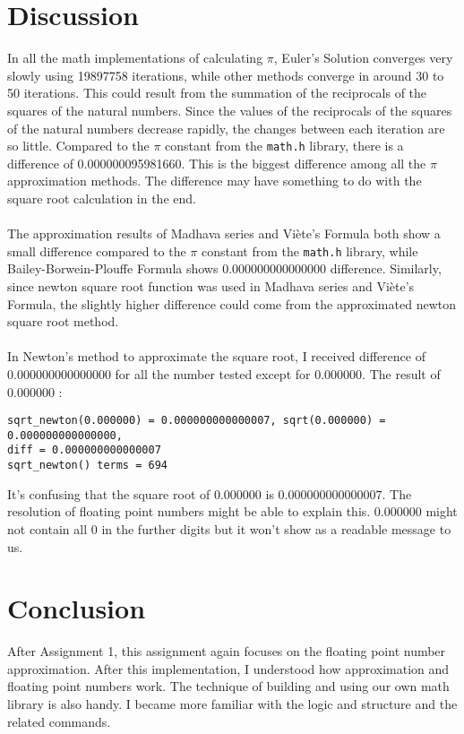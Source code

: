 \documentclass[12pt]{article}
\begin{document}
\section{Discussion}

In all the math implementations of calculating $\pi$, Euler’s Solution converges very slowly using 19897758 iterations, while other methods converge in around 30 to 50 iterations. This could result from the summation of the reciprocals of the squares of the natural numbers. Since the values of the reciprocals of the squares of the natural numbers decrease rapidly, the changes between each iteration are so little. Compared to the $\pi$ constant from the \texttt{math.h} library, there is a difference of 0.000000095981660. This is the biggest difference among all the $\pi$ approximation methods. The difference may have something to do with the square root calculation in the end.\\
\\
The approximation results of Madhava series and Viète’s Formula both show a small difference compared to the $\pi$ constant from the \texttt{math.h} library, while Bailey-Borwein-Plouffe Formula shows $0.000000000000000$ difference. Similarly, since newton square root function was used in Madhava series and Viète’s Formula, the slightly higher difference could come from the approximated newton square root method. \\
\\
In Newton’s method to approximate the square root, I received difference of $0.000000000000000$ for all the number tested except for $0.000000$. The result of $0.000000$ : \\
\begin{verbatim}
sqrt_newton(0.000000) = 0.000000000000007, sqrt(0.000000) = 0.000000000000000, 
diff = 0.000000000000007
sqrt_newton() terms = 694
\end{verbatim} 
It's confusing that the square root of $0.000000$ is $0.000000000000007$. The resolution of floating point numbers might be able to explain this. $0.000000$ might not contain all $0$ in the further digits but it won't show as a readable message to us. \\

\section{Conclusion}

After Assignment 1, this assignment again focuses on the floating point number approximation. After this implementation, I understood how approximation and floating point numbers work. The technique of building and using our own math library is also handy. I became more familiar with the logic and structure and the related commands.
\end{document}
